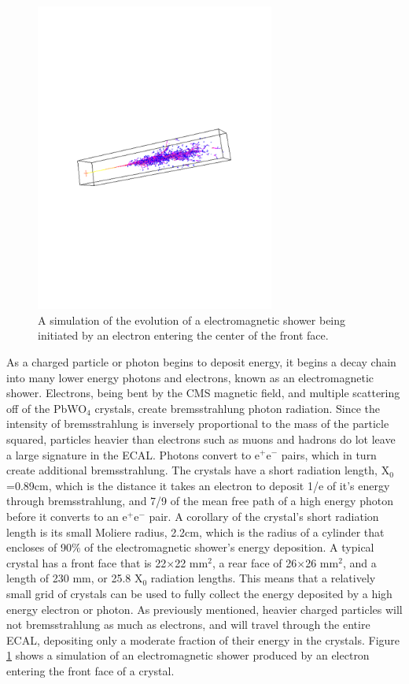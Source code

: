 \begin{figure}[h]
   \centering
  \includegraphics[width=0.7\textwidth]{Figures/CMS_Diagrams/ECAL__shower_simulation.pdf}
  \caption{A simulation of the evolution of a electromagnetic shower
    being initiated by an electron entering the center of the front face. } \label{fig:ecal_shower}
\end{figure}

\par As a charged particle or photon begins to deposit energy, it
begins a decay chain into many lower energy photons and electrons,
known as an electromagnetic shower.  Electrons, being bent by the CMS
magnetic field, and multiple scattering off of the PbWO$_{4}$
crystals, create bremsstrahlung photon radiation.  Since the intensity
of bremsstrahlung is inversely proportional to the mass of the
particle squared, particles heavier than electrons such as muons and
hadrons do lot leave a large signature in the ECAL.  Photons convert
to e$^{+}$e$^{-}$ pairs, which in turn create additional
bremsstrahlung. The crystals have a short radiation length,
X$_{0}$=0.89cm, which is the distance it takes an electron to deposit
1/e of it's energy through bremsstrahlung, and 7/9 of the mean free
path of a high energy photon before it converts to an  e$^{+}$e$^{-}$
pair.  A corollary of the crystal's short radiation length is its
small Moliere radius, 2.2cm, which is the radius of a cylinder that
encloses of 90$\%$ of the electromagnetic shower's energy
deposition. A typical crystal has a front face that is 22$\times$22
mm$^{2}$, a rear face of 26$\times$26 mm$^{2}$, and a length of 230
mm, or 25.8 X$_{0}$ radiation lengths.  This means that a relatively
small grid of crystals can be used to fully collect the energy
deposited by a high energy electron or photon.  As previously
mentioned, heavier charged particles will not bremsstrahlung as much
as electrons, and will travel through the entire ECAL, depositing only
a moderate fraction of their energy in the crystals.  Figure
\ref{fig:ecal_shower} shows a simulation of an electromagnetic shower
produced by an electron entering the front face of a crystal.      

